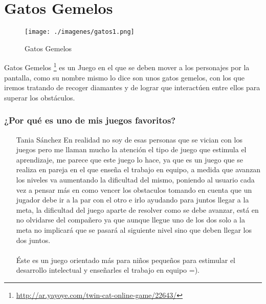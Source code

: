 \section{Gatos Gemelos}

\begin{figure}[htbp]
\begin{center}
\texttt{[image: ./imagenes/gatos1.png]}
\caption{Gatos Gemelos}
\label{Gatos Gemelos}
\end{center}
\end{figure}
Gatos Gemelos \footnote{\url{http://ar.yayoye.com/twin-cat-online-game/22643/}} es un Juego en el que se deben mover a los personajes por la pantalla, como su nombre mismo lo dice son unos gatos gemelos, con los que iremos tratando de recoger diamantes y de lograr que interactúen entre ellos para superar los obstáculos.

\subsubsection{¿Por qué es uno de mis juegos favoritos?}
\begin{itemize}
\item[Tania Sánchez] En realidad no soy de esas personas que se vician con los juegos pero me llaman mucho la atención el tipo de juego que estimula el aprendizaje, me parece que este juego lo hace, ya que es un juego que se realiza en pareja en el que enseña el trabajo en equipo, a medida que avanzan los niveles va aumentando la dificultad del mismo, poniendo al usuario cada vez a pensar más en como vencer los obstaculos tomando en cuenta que un jugador debe ir a la par con el otro e irlo ayudando para juntos llegar a la meta, la dificultad del juego aparte de resolver como se debe avanzar, está en no olvidarse del compañero ya que aunque llegue uno de los dos solo a la meta no implicará que se pasará al siguiente nivel sino que deben llegar los dos juntos. 
\\
\\
Éste es un juego orientado más para niños pequeños para estimular el desarrollo intelectual y enseñarles el trabajo en equipo =).
\end{itemize}